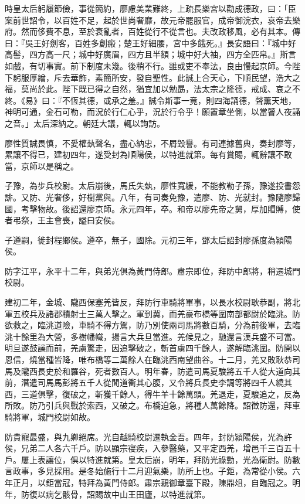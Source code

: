 \begin{pinyinscope}
時皇太后躬履節儉，事從簡約，廖慮美業難終，上疏長樂宮以勸成德政，曰：「臣案前世詔令，以百姓不足，起於世尚奢靡，故元帝罷服官，成帝御浣衣，哀帝去樂府。然而侈費不息，至於衰亂者，百姓從行不從言也。夫改政移風，必有其本。傳曰：『吳王好劍客，百姓多創瘢；楚王好細腰，宮中多餓死。』長安語曰：『城中好高髻，四方高一尺；城中好廣眉，四方且半額；城中好大袖，四方全匹帛。』斯言如戲，有切事實。前下制度未幾。後稍不行。雖或吏不奉法，良由慢起京師。今陛下躬服厚繒，斥去華飾，素簡所安，發自聖性。此誠上合天心，下順民望，浩大之福，莫尚於此。陛下既已得之自然，猶宜加以勉勗，法太宗之隆德，戒成、哀之不終。《易》曰：『不恆其德，或承之羞。』誠令斯事一竟，則四海誦德，聲薰天地，神明可通，金石可勒，而況於行仁心乎，況於行令乎！願置章坐側，以當瞽人夜誦之音。」太后深納之。朝廷大議，輒以詢訪。

廖性質誠畏慎，不愛權埶聲名，盡心納忠，不屑毀譽。有司連據舊典，奏封廖等，累讓不得已，建初四年，遂受封為順陽侯，以特進就第。每有賞賜，輒辭讓不敢當，京師以是稱之。

子豫，為步兵校尉。太后崩後，馬氏失埶，廖性寬緩，不能教勒子孫，豫遂投書怨誹。又防、光奢侈，好樹黨與。八年，有司奏免豫，遣廖、防、光就封。豫隨廖歸國，考擊物故。後詔還廖京師。永元四年，卒。和帝以廖先帝之舅，厚加賵賻，使者弔祭，王主會喪，謚曰安侯。

子遵嗣，徙封程鄉侯。遵卒，無子，國除。元初三年，鄧太后詔封廖孫度為潁陽侯。

防字江平，永平十二年，與弟光俱為黃門侍郎。肅宗即位，拜防中郎將，稍遷城門校尉。

建初二年，金城、隴西保塞羌皆反，拜防行車騎將軍事，以長水校尉耿恭副，將北軍五校兵及諸郡積射士三萬人擊之。軍到冀，而羌豪布橋等圍南部都尉於臨洮。防欲救之，臨洮道險，車騎不得方駕，防乃別使兩司馬將數百騎，分為前後軍，去臨洮十餘里為大營，多樹幡幟，揚言大兵旦當進。羌候見之，馳還言漢兵盛不可當。明旦遂鼓譟而前，羌虜驚走，因追擊破之，斬首虜四千餘人，遂解臨洮圍。防開以恩信，燒當種皆降，唯布橋等二萬餘人在臨洮西南望曲谷。十二月，羌又敗耿恭司馬及隴西長史於和羅谷，死者數百人。明年春，防遣司馬夏駿將五千人從大道向其前，潛遣司馬馬彭將五千人從閒道衝其心腹，又令將兵長史李調等將四千人繞其西，三道俱擊，復破之，斬獲千餘人，得牛羊十餘萬頭。羌退走，夏駿追之，反為所敗。防乃引兵與戰於索西，又破之。布橋迫急，將種人萬餘降。詔徵防還，拜車騎將軍，城門校尉如故。

防貴寵最盛，與九卿絕席。光自越騎校尉遷執金吾。四年，封防潁陽侯，光為許侯，兄弟二人各六千戶。防以顯宗寑疾，入參醫藥，又平定西羌，增邑千三百五十戶。屢上表讓位，俱以特進就第。皇太后崩，明年，拜防光祿勳，光為衛尉。防數言政事，多見採用。是冬始施行十二月迎氣樂，防所上也。子鉅，為常從小侯。六年正月，以鉅當冠，特拜為黃門侍郎。肅宗親御章臺下殿，陳鼎俎，自臨冠之。明年，防復以病乞骸骨，詔賜故中山王田廬，以特進就第。


\end{pinyinscope}
